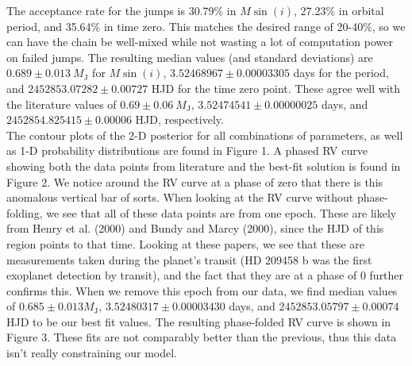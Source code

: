 \documentclass[12pt]{article}
\begin{document}
\indent The acceptance rate for the jumps is 30.79\% in $M\sin(i)$, 27.23\% in orbital period, and 35.64\% in time zero. This matches the desired range of 20-40\%, so we can have the chain be well-mixed while not wasting a lot of computation power on failed jumps. 
The resulting median values (and standard deviations) are $0.689\pm0.013\ M_\text{J}$ for $M\sin(i)$, $3.52468967\pm0.00003305$ days for the period, and $2452853.07282\pm0.00727$ HJD for the time zero point. These agree well with the literature values of $0.69\pm0.06\ M_\text{J}$, $3.52474541\pm0.00000025$ days, and $2452854.825415\pm0.00006$ HJD, respectively.\\
\indent The contour plots of the 2-D posterior for all combinations of parameters, as well as 1-D probability distributions are found in Figure 1. 
A phased RV curve showing both the data points from literature and the best-fit solution is found in Figure 2. We notice around the RV curve at a phase of zero that there is this anomalous vertical bar of sorts.  When looking at the RV curve without phase-folding, we see that all of these data points are from one epoch. These are likely from Henry et al. (2000) and Bundy and Marcy (2000), since the HJD of this region points to that time. Looking at these papers, we see that these are measurements taken during the planet's transit (HD 209458 b was the first exoplanet detection by transit), and the fact that they are at a phase of 0 further confirms this. When we remove this epoch from our data, we find median values of $0.685\pm0.013 M_\text{J}$, $3.52480317\pm0.00003430$ days, and $2452853.05797\pm0.00074$ HJD to be our best fit values. The resulting phase-folded RV curve is shown in Figure 3. These fits are not comparably better than the previous, thus this data isn't really constraining our model. 
\end{document}

